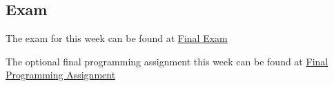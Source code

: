 \subsection{Exam}

The exam for this week can be found at \href{https://applied.cs.colorado.edu/mod/quiz/view.php?id=52201}{Final Exam}   \vspace*{1em}

The optional final programming assignment this week can be found at \href{https://applied.cs.colorado.edu/mod/quiz/view.php?id=51924}{Final Programming Assignment} \textbullet {}  